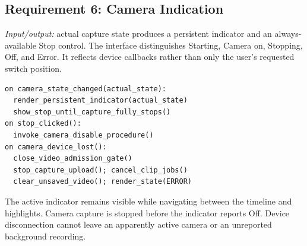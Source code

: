 \subsection{Requirement 6: Camera Indication}
\textit{Input/output:} actual capture state produces a persistent indicator and an always-available Stop control. The interface distinguishes Starting, Camera on, Stopping, Off, and Error. It reflects device callbacks rather than only the user's requested switch position.
\par\smallskip\noindent\begin{minipage}{\columnwidth}
\begin{lstlisting}
on camera_state_changed(actual_state):
  render_persistent_indicator(actual_state)
  show_stop_until_capture_fully_stops()
on stop_clicked():
  invoke_camera_disable_procedure()
on camera_device_lost():
  close_video_admission_gate()
  stop_capture_upload(); cancel_clip_jobs()
  clear_unsaved_video(); render_state(ERROR)
\end{lstlisting}
\end{minipage}\par
The active indicator remains visible while navigating between the timeline and highlights. Camera capture is stopped before the indicator reports Off. Device disconnection cannot leave an apparently active camera or an unreported background recording.

